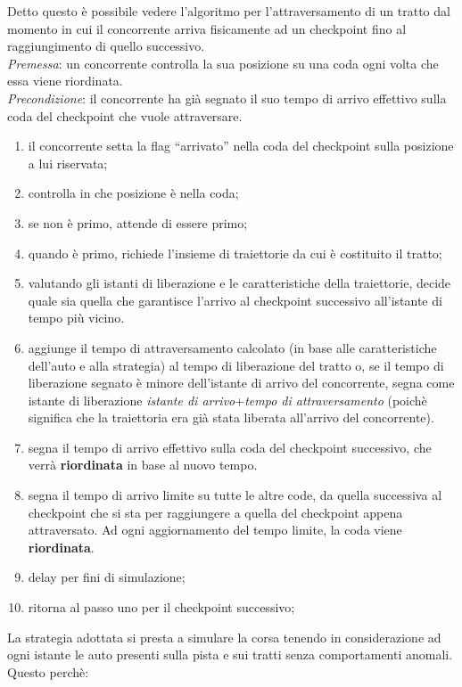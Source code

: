 Detto questo \`{e} possibile vedere l'algoritmo per l'attraversamento di un tratto dal momento in cui il concorrente arriva fisicamente ad un checkpoint
fino al raggiungimento di quello successivo.\\
\emph{Premessa}: un concorrente controlla la sua posizione su una coda ogni volta che essa viene riordinata.\\
\emph{Precondizione}: il concorrente ha gi\`{a} segnato il suo tempo di arrivo effettivo sulla coda del checkpoint che vuole attraversare.
\begin{enumerate}
\item il concorrente setta la flag ``arrivato'' nella coda del checkpoint sulla posizione a lui riservata;
\item controlla in che posizione \`{e} nella coda;
\item se non \`{e} primo, attende di essere primo;
\item quando \`{e} primo, richiede l'insieme di traiettorie da cui \`{e} costituito il tratto;
\item valutando gli istanti di liberazione e le caratteristiche della traiettorie, decide quale sia quella che garantisce l'arrivo al checkpoint
successivo all'istante di tempo pi\`{u} vicino.
\item aggiunge il tempo di attraversamento calcolato (in base alle caratteristiche dell'auto e alla strategia) al tempo di liberazione del tratto o, 
se il tempo di liberazione segnato \`{e} minore dell'istante di arrivo del concorrente, segna come istante di liberazione \emph{istante di arrivo}+\emph{tempo
di attraversamento} (poich\`{e} significa che la traiettoria era gi\`{a} stata liberata all'arrivo del concorrente).
\item segna il tempo di arrivo effettivo sulla coda del checkpoint successivo, che verr\`{a} \textbf{riordinata} in base al nuovo tempo.
\item segna il tempo di arrivo limite su tutte le altre code, da quella successiva al checkpoint che si sta per raggiungere a quella del checkpoint
appena attraversato. Ad ogni aggiornamento del tempo limite, la coda viene \textbf{riordinata}.
\item delay per fini di simulazione;
\item ritorna al passo uno per il checkpoint successivo;
\end{enumerate}
La strategia adottata si presta a simulare la corsa tenendo in considerazione ad ogni istante le auto presenti sulla pista e sui tratti senza comportamenti
anomali. Questo perch\`{e}:
